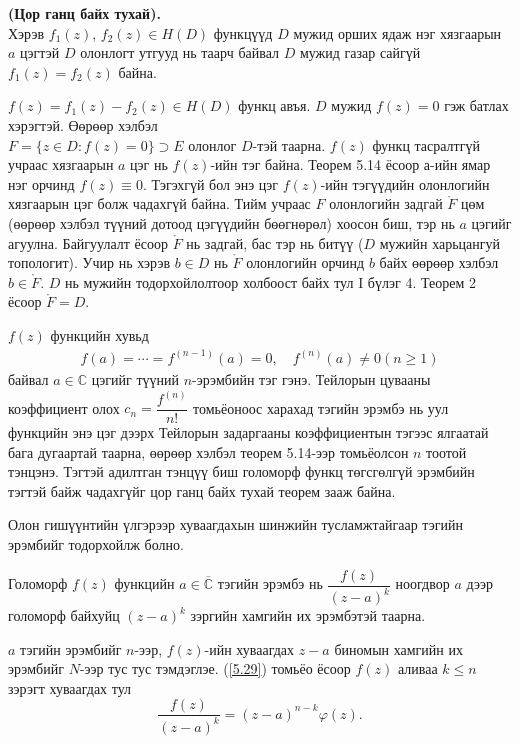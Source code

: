 \begin{thm}
\textbf{(Цор ганц байх тухай).} \\
Хэрэв $f_1(z)$, $f_2(z)\in H(D)$ функцүүд $D$ мужид орших ядаж нэг хязгаарын $a$ цэгтэй $D$ олонлогт утгууд нь таарч байвал $D$ мужид газар сайгүй $f_1(z)=f_2(z)$ байна.
\end{thm}
\begin{prf}
$f(z)=f_1(z)-f_2(z)\in H(D)$ функц авъя. $D$ мужид $f(z)=0$ гэж батлах хэрэгтэй. Өөрөөр хэлбэл\\
$F=\{z\in D:f(z)=0\} \supset E$ олонлог $D$-тэй таарна. $f(z)$ функц тасралтгүй учраас хязгаарын $a$ цэг нь $f(z)$-ийн тэг байна. Теорем 5.14 ёсоор а-ийн ямар нэг орчинд $f(z)\equiv 0$. Тэгэхгүй бол энэ цэг $f(z)$-ийн тэгүүдийн олонлогийн хязгаарын цэг болж чадахгүй байна. Тийм учраас $F$ олонлогийн задгай $\mathring{F}$ цөм (өөрөөр хэлбэл түүний дотоод цэгүүдийн бөөгнөрөл) хоосон биш, тэр нь $a$ цэгийг агуулна. Байгуулалт
ёсоор  $\mathring{F}$  нь задгай, бас тэр нь битүү ($D$ мужийн харьцангуй топологит). Учир нь хэрэв $b\in D$ нь $\mathring{F}$ олонлогийн орчинд $b$ байх өөрөөр хэлбэл $b\in \mathring{F}$. $D$ нь мужийн тодорхойлолтоор холбоост байх тул I бүлэг 4. Теорем 2 ёсоор $\mathring{F}=D$. 
 \end{prf}
\begin{dfn}
$f(z)$ функцийн хувьд 
\begin{eqnarray}
     f(a)=\cdots =f^{(n-1)}(a)=0, \quad f^{(n)}(a)\neq 0(n  \geq 1)
\end{eqnarray}
байвал $a\in\mathbb{C}$ цэгийг түүний $n$-эрэмбийн тэг  гэнэ. Тейлорын цувааны коэффициент олох $c_n=\dfrac{f^{(n)}}{n!}$ томьёоноос харахад тэгийн эрэмбэ нь уул функцийн энэ цэг дээрх Тейлорын задаргааны коэффициентын тэгээс ялгаатай бага дугаартай таарна, өөрөөр хэлбэл теорем 5.14-ээр томьёолсон $n$ тоотой тэнцэнэ. Тэгтэй адилтган тэнцүү биш голоморф функц төгсгөлгүй эрэмбийн тэгтэй байж чадахгүйг цор ганц байх тухай теорем зааж байна.

Олон гишүүнтийн үлгэрээр хуваагдахын шинжийн тусламжтайгаар тэгийн эрэмбийг тодорхойлж болно. 
\end{dfn}
\begin{thm}
Голоморф $f(z)$ функцийн $a\in\overline{\mathbb{C}}$ тэгийн эрэмбэ нь $\dfrac{f(z)}{(z-a)^k}$ ноогдвор $a$ дээр голоморф байхуйц $(z-a)^k$ зэргийн  хамгийн их эрэмбэтэй таарна.
\end{thm}
\begin{prf}
$a$ тэгийн эрэмбийг $n$-ээр, $f(z)$-ийн хуваагдах $z-a$ биномын хамгийн их эрэмбийг $N$-ээр тус тус тэмдэглэе. (\ref{5.29}) томьёо ёсоор $f(z)$ аливаа $k\leq n$ зэрэгт хуваагдах тул
$$\frac{f(z)}{(z-a)^k}=(z-a)^{n-k}\varphi (z).$$
 \end{prf}
